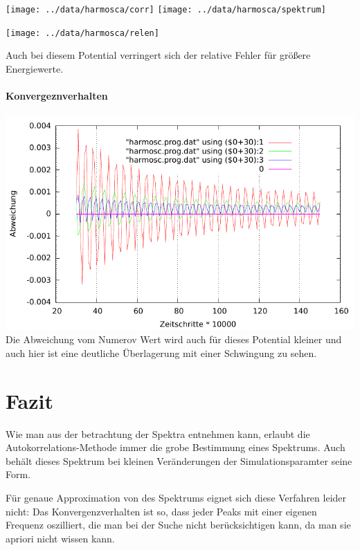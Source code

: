 \documentclass[10pt,a4paper,german]{scrartcl}
\begin{document}
			  
		
			  \begin{center}\end{center}
			  
		  	\texttt{[image: ../data/harmosca/corr]}
    		\texttt{[image: ../data/harmosca/spektrum]}
			  
	  		\texttt{[image: ../data/harmosca/relen]}
	  		
	  		Auch bei diesem Potential verringert sich der relative Fehler 
	  		für größere Energiewerte.
	  		
  			\paragraph*{Konvergeznverhalten}
  			  \includegraphics[scale=.62]{../static/harmosc_konv.pdf}
  			  Die Abweichung vom Numerov Wert wird auch für dieses Potential
  			  kleiner und auch hier ist eine deutliche Überlagerung
  		    mit einer Schwingung zu sehen.
  		    
	\section{Fazit}
		Wie man aus der betrachtung der Spektra entnehmen kann, erlaubt die
		Autokorrelations-Methode immer die grobe Bestimmung eines Spektrums.
		Auch behält dieses Spektrum bei kleinen Veränderungen der 
		Simulationsparamter seine Form.
		
		
		Für genaue Approximation von des Spektrums eignet sich diese Verfahren
		leider nicht: Das Konvergenzverhalten ist so, dass jeder Peaks
		mit einer eigenen Frequenz oszilliert, die man bei der Suche nicht 
		berücksichtigen kann, da man sie apriori nicht wissen kann.
		
\end{document}
